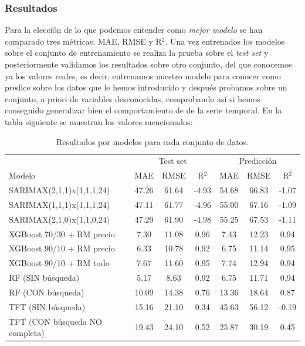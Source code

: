 \subsubsection{Resultados}
%
%
%
Para la elección de lo que podemos entender como \textit{mejor modelo} se han comparado tres métricas: MAE, RMSE y R$^2$. Una vez entrenados los modelos sobre el conjunto de entrenamiento se realiza la prueba sobre el \textit{test set} y posteriormente validamos los resultados sobre otro conjunto, del que conocemos ya los valores reales, es decir, entrenamos nuestro modelo para conocer como predice sobre los datos que le hemos introducido y después probamos sobre un conjunto, a priori de variables desconocidas, comprobando así si hemos conseguido generalizar bien el comportamiento de de la serie temporal. En la tabla siguiente se muestran los valores mencionados:
\begin{table}[H]
    \centering
    \begin{tabular}{l|ccc|ccc}
        & \multicolumn{3}{c}{Test set} & \multicolumn{3}{c}{Predicción} \\
        Modelo & MAE & RMSE & R$^2$ & MAE & RMSE & R$^2$ \\
        \hline
        SARIMAX(2,1,1)x(1,1,1,24) & 47.26 & 61.64 & -4.93 & 54.68 & 66.83 & -1.07 \\
        SARIMAX(1,1,1)x(1,1,1,24) & 47.11 & 61.77 & -4.96 & 55.00 & 67.16 & -1.09 \\
        SARIMAX(2,1,0)x(1,1,0,24) & 47.29 & 61.90 & -4.98 & 55.25 & 67.53 & -1.11 \\
        XGBoost 70/30 + RM precio  & 7.30  & 11.08 & 0.96 & 7.43  & 12.23 & 0.94 \\
        XGBoost 90/10 + RM precio  & 6.33  & 10.78 & 0.92 & 6.75  & 11.14 & 0.95 \\
        XGBoost 90/10 + RM todo    & 7.67  & 11.60 & 0.95 & 7.74  & 12.94 & 0.94 \\
        RF (SIN búsqueda) & 5.17  & 8.63  & 0.92 & 6.75  & 11.71 & 0.94 \\
        RF (CON búsqueda) & 10.09 & 14.38 & 0.76 & 13.36 & 18.64 & 0.87 \\
        TFT (SIN búsqueda)& 15.16    & 21.10    & 0.34   & 45.63    & 56.12          & -0.19 \\
        TFT (CON búsqueda NO completa)&19.43    & 24.10    & 0.52   & 25.87    & 30.19          & 0.45   \\
    \end{tabular}
    \caption{Resultados por modelos para cada conjunto de datos.}
    \label{tab:resultados_modelos}
\end{table}

